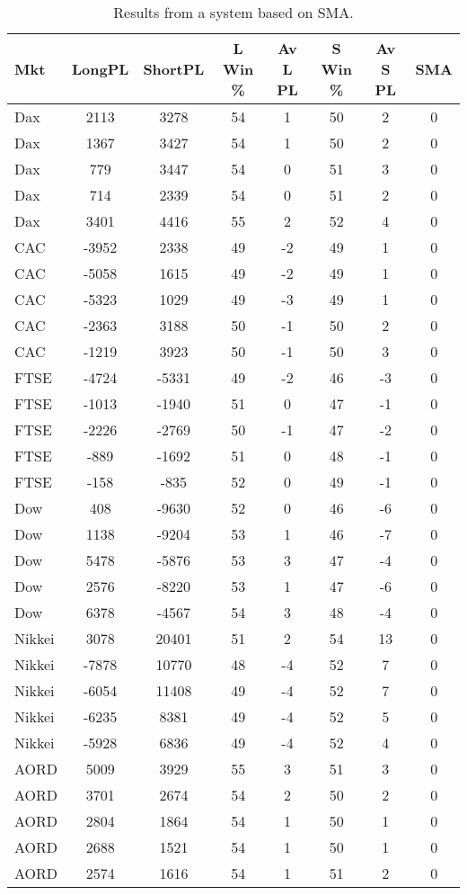 \begin{table}[ht]
\centering
\caption[Results from a system based on SMA]{Results from a system based on SMA.} 
\label{tab:sma_results}
\begin{tabular}{lccccccc}
  \toprule Mkt & LongPL & ShortPL & L Win \% & Av L PL & S Win \% & Av S PL & SMA \\ 
  \midrule Dax & 2113 & 3278 & 54 & 1 & 50 & 2 & 0 \\ 
  Dax & 1367 & 3427 & 54 & 1 & 50 & 2 & 0 \\ 
  Dax & 779 & 3447 & 54 & 0 & 51 & 3 & 0 \\ 
  Dax & 714 & 2339 & 54 & 0 & 51 & 2 & 0 \\ 
  Dax & 3401 & 4416 & 55 & 2 & 52 & 4 & 0 \\ 
  CAC & -3952 & 2338 & 49 & -2 & 49 & 1 & 0 \\ 
  CAC & -5058 & 1615 & 49 & -2 & 49 & 1 & 0 \\ 
  CAC & -5323 & 1029 & 49 & -3 & 49 & 1 & 0 \\ 
  CAC & -2363 & 3188 & 50 & -1 & 50 & 2 & 0 \\ 
  CAC & -1219 & 3923 & 50 & -1 & 50 & 3 & 0 \\ 
  FTSE & -4724 & -5331 & 49 & -2 & 46 & -3 & 0 \\ 
  FTSE & -1013 & -1940 & 51 & 0 & 47 & -1 & 0 \\ 
  FTSE & -2226 & -2769 & 50 & -1 & 47 & -2 & 0 \\ 
  FTSE & -889 & -1692 & 51 & 0 & 48 & -1 & 0 \\ 
  FTSE & -158 & -835 & 52 & 0 & 49 & -1 & 0 \\ 
  Dow & 408 & -9630 & 52 & 0 & 46 & -6 & 0 \\ 
  Dow & 1138 & -9204 & 53 & 1 & 46 & -7 & 0 \\ 
  Dow & 5478 & -5876 & 53 & 3 & 47 & -4 & 0 \\ 
  Dow & 2576 & -8220 & 53 & 1 & 47 & -6 & 0 \\ 
  Dow & 6378 & -4567 & 54 & 3 & 48 & -4 & 0 \\ 
  Nikkei & 3078 & 20401 & 51 & 2 & 54 & 13 & 0 \\ 
  Nikkei & -7878 & 10770 & 48 & -4 & 52 & 7 & 0 \\ 
  Nikkei & -6054 & 11408 & 49 & -4 & 52 & 7 & 0 \\ 
  Nikkei & -6235 & 8381 & 49 & -4 & 52 & 5 & 0 \\ 
  Nikkei & -5928 & 6836 & 49 & -4 & 52 & 4 & 0 \\ 
  AORD & 5009 & 3929 & 55 & 3 & 51 & 3 & 0 \\ 
  AORD & 3701 & 2674 & 54 & 2 & 50 & 2 & 0 \\ 
  AORD & 2804 & 1864 & 54 & 1 & 50 & 1 & 0 \\ 
  AORD & 2688 & 1521 & 54 & 1 & 50 & 1 & 0 \\ 
  AORD & 2574 & 1616 & 54 & 1 & 51 & 2 & 0 \\ 
   \bottomrule \end{tabular}
\end{table}
